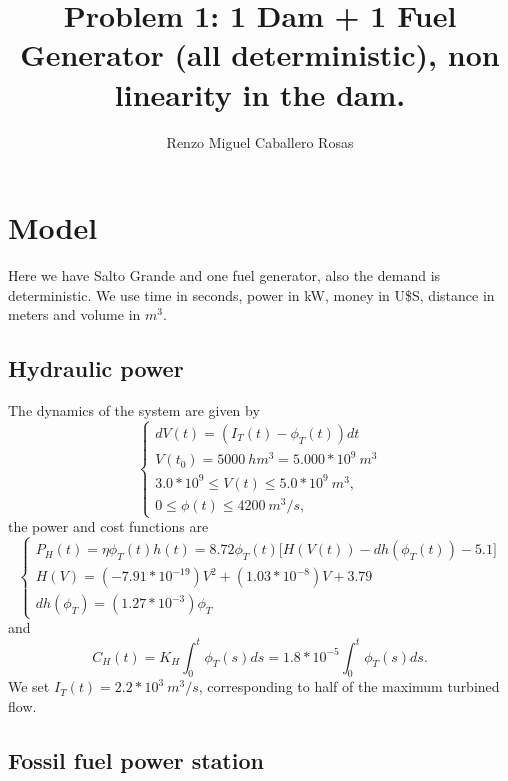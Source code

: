 \documentclass[12pt]{article}
\theoremstyle{definition}
\theoremstyle{remark}
\begin{document}
\title{Problem 1: 1 Dam + 1 Fuel Generator (all deterministic), non linearity in the dam.}
\author{Renzo Miguel Caballero Rosas} 
\maketitle

\pagebreak
\tableofcontents
\pagebreak

\section{Model}

Here we have Salto Grande and one fuel generator, also the demand is deterministic. We use time in seconds, power in kW, money in U\$S, distance in meters and volume in $m^3$.

\subsection{Hydraulic power}

The dynamics of the system are given by
\begin{equation*}
\begin{cases}
dV(t)=(I_T(t)-\phi_T(t))dt\\
V(t_0)=5000\ hm^3=5.000*10^9\ m^3\\
3.0*10^9\leq V(t)\leq5.0*10^9\ m^3,\\
0\leq\phi(t)\leq4200\ m^3/s,
\end{cases}
\end{equation*}
the power and cost functions are
\begin{equation*}
\begin{cases}
P_H(t)=\eta\phi_T(t)h(t)=8.72\phi_T(t)\Big[H(V(t))-dh(\phi_T(t))-5.1\Big]\\
H(V)=(-7.91*10^{-19})V^2+(1.03*10^{-8})V+3.79\\
dh(\phi_T)=(1.27*10^{-3})\phi_T
\end{cases}
\end{equation*}
and
\begin{equation*}
C_H(t)=K_H\int_0^t\phi_T(s)ds=1.8*10^{-5}\int_0^t\phi_T(s)ds.
\end{equation*}
We set $I_T(t)=2.2*10^3\ m^3/s$, corresponding to half of the maximum turbined flow.

\subsection{Fossil fuel power station}
\end{document}
